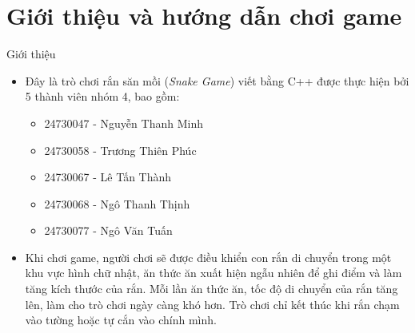 \documentclass{beamer}
\begin{document}
\section{Giới thiệu và hướng dẫn chơi game}
\begin{frame}{Giới thiệu}
    \begin{itemize}
        \item Đây là trò chơi rắn săn mồi (\textit{Snake Game}) viết bằng C++ được thực hiện bởi 5 thành viên nhóm 4, bao gồm:
        \begin{itemize}
            \item 24730047 - Nguyễn Thanh Minh
            \item 24730058 - Trương Thiên Phúc
            \item 24730067 - Lê Tấn Thành
            \item 24730068 - Ngô Thanh Thịnh
            \item 24730077 - Ngô Văn Tuấn
        \end{itemize}
        \item Khi chơi game, người chơi sẽ được điều khiển con rắn di chuyển trong một khu vực hình chữ nhật, ăn thức ăn xuất hiện ngẫu nhiên để ghi điểm và làm tăng kích thước của rắn. Mỗi lần ăn thức ăn, tốc độ di chuyển của rắn tăng lên, làm cho trò chơi ngày càng khó hơn. Trò chơi chỉ kết thúc khi rắn chạm vào tường hoặc tự cắn vào chính mình.
    \end{itemize}
\end{frame}
\end{document}
